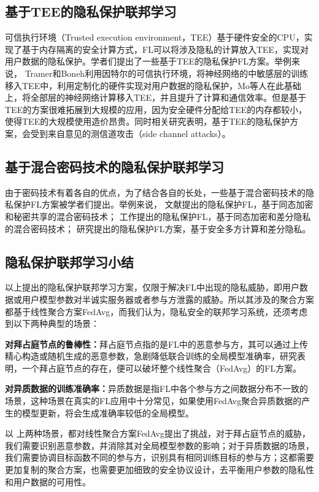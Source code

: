 \subsection{基于TEE的隐私保护联邦学习}
可信执行环境（Trusted execution environment，TEE）基于硬件安全的CPU，实现了基于内存隔离的安全计算方式，FL可以将涉及隐私的计算放入TEE，实现对用户数据的隐私保护。学者们提出了一些基于TEE的隐私保护FL方案\cite{tramer2018slalom, mo2019efficient, mo2021ppfl, mo2020darknetz}。举例来说，
Tramer和Boneh\cite{tramer2018slalom}利用因特尔的可信执行环境，将神经网络的中敏感层的训练移入TEE中，利用定制化的硬件实现对用户数据的隐私保护，Mo等人\cite{mo2021ppfl}在此基础上，将全部层的神经网络计算移入TEE，并且提升了计算和通信效率。但是基于TEE的方案很难拓展到大规模的应用，因为安全硬件分配给TEE的内存都较小，使得TEE的大规模使用造价昂贵。同时相关研究\cite{van2018foreshadow}表明，基于TEE的隐私保护方案，会受到来自意见的测信道攻击（side channel attacks）。

\subsection{基于混合密码技术的隐私保护联邦学习}
由于密码技术有着各自的优点，为了结合各自的长处，一些基于混合密码技术的隐私保护FL方案\cite{choquette2021capc, hao2019efficient, hao2019towards, mugunthan2019smpai, truex2019hybrid, xu2019verifynet, xu2019hybridalpha, zhang2020privacy, zhao2020smss}被学者们提出。举例来说，
文献\cite{xu2019verifynet, zhao2020smss}提出的隐私保护FL，基于同态加密和秘密共享的混合密码技术；
工作\cite{hao2019efficient, hao2019towards}提出的隐私保护FL，基于同态加密和差分隐私的混合密码技术；
研究\cite{mugunthan2019smpai, truex2019hybrid, xu2019hybridalpha}提出的隐私保护FL方案，基于安全多方计算和差分隐私。

\subsection{隐私保护联邦学习小结}
以上提出的隐私保护联邦学习方案，仅限于解决FL中出现的隐私威胁，即用户数据或用户模型参数对半诚实服务器或者参与方泄露的威胁。所以其涉及的聚合方案都基于线性聚合方案FedAvg\cite{mcmahan2017communication}，而我们认为，隐私安全的联邦学习系统，还须考虑到以下两种典型的场景：
\begin{compactitem}
	\item \textbf{对拜占庭节点的鲁棒性：}拜占庭节点指的是FL中的恶意参与方，其可以通过上传精心构造或随机生成的恶意参数，急剧降低联合训练的全局模型准确率，研究\cite{blanchard2017machine}表明，一个拜占庭节点的存在，便可以破坏整个线性聚合（FedAvg）的FL方案。
	\item \textbf{对异质数据的训练准确率：}异质数据是指FL中各个参与方之间数据分布不一致的场景，这种场景在真实的FL应用中十分常见\cite{li2020federated, gao2022feddc, ghosh2020efficient, briggs2020federated}，如果使用FedAvg聚合异质数据的产生的模型更新，将会生成准确率较低的全局模型。
\end{compactitem}
以 上两种场景，都对线性聚合方案FedAvg提出了挑战，对于拜占庭节点的威胁，我们需要识别恶意参数，并消除其对全局模型参数的影响；对于异质数据的场景，我们需要协调目标函数不同的参与方，识别具有相同训练目标的参与方；这都需要更加复制的聚合方案，也需要更加细致的安全协议设计，去平衡用户参数的隐私性和用户数据的可用性。

